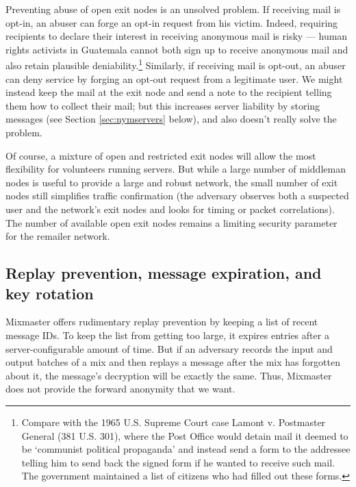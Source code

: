 \documentclass[11pt]{IEEEtran}
\begin{document}
Preventing abuse of open exit nodes is an unsolved problem. If
receiving mail is opt-in, an abuser can forge an opt-in request from
his victim. Indeed, requiring recipients to declare their interest
in receiving anonymous mail is risky --- human rights activists in
Guatemala cannot both sign up to receive anonymous mail and also retain
plausible deniability.\footnote{
  Compare with the 1965 U.S. Supreme Court case Lamont v. Postmaster
  General (381 U.S. 301), where the Post Office would detain mail it
  deemed to be `communist political propaganda' and instead send a form
  to the addressee telling him to send back the signed form if he wanted
  to receive such mail. The government maintained a list of citizens
  who had filled out these forms.
} Similarly, if receiving mail is opt-out, an abuser can deny service
by forging an opt-out request from a legitimate user. We might instead
keep the mail at the exit node and send a note to the recipient
telling them how to collect their mail; but this increases
server liability by storing messages (see Section \ref{sec:nymservers}
below), and also doesn't really solve the problem.

Of course, a mixture of open and restricted exit nodes will allow the
most flexibility for volunteers running servers. But while a large number
of middleman nodes is useful to provide a large and robust network, the
small number of exit nodes still simplifies traffic confirmation
(the adversary observes both a suspected user and the
network's exit nodes and looks for timing or packet correlations). The
number of available open exit nodes remains a limiting security parameter
for the remailer network.

\subsection{Replay prevention, message expiration, and key rotation}

Mixmaster offers rudimentary replay prevention by keeping a list of recent
message IDs. To keep the list from getting too large, it expires entries
after a server-configurable amount of time. But if an adversary records
the input and output batches of a mix and then replays a message after
the mix has forgotten about it, the message's decryption will be exactly
the same. Thus, Mixmaster does not provide the forward anonymity that we want.
\end{document}
